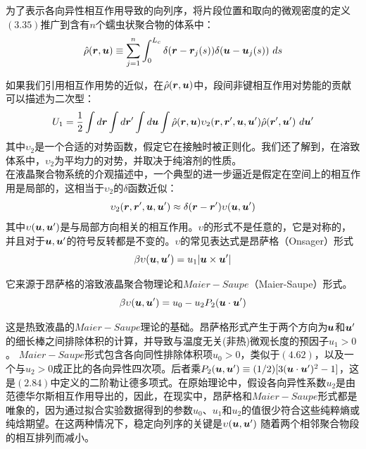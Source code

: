 为了表示各向异性相互作用导致的向列序，将片段位置和取向的微观密度的定义$(3.35)$推广到含有$n$个蠕虫状聚合物的体系中：\\
\begin{equation}
\hat{\rho}(\bm{r},\bm{u}) \equiv \sum_{j=1}^{n} \int _{0}^{L_{c}} \delta(\bm{r}-\bm{r}_{j}(s)) \delta (\bm{u}-\bm{u}_{j}(s))~ds
\end{equation}

如果我们引用相互作用势的近似，在$\hat{\rho}(\bm{r},\bm{u})$中，段间非键相互作用对势能的贡献可以描述为二次型：\\
\begin{equation}
U_1=\frac{1}{2} \int d\bm{r} \int d\bm{r}' \int d\bm{u} \int  \hat{\rho}(\bm{r},\bm{u}) \upsilon_2(\bm{r},\bm{r}',\bm{u},\bm{u}') \hat{\rho}(\bm{r}',\bm{u}')~d\bm{u}'
\end{equation}
其中$\upsilon_2$是一个合适的对势函数，假定它在接触时被正则化。我们还了解到，在溶致体系中，$\upsilon_2$为平均力的对势，并取决于纯溶剂的性质。\\

在液晶聚合物系统的介观描述中，一个典型的进一步逼近是假定在空间上的相互作用是局部的，这相当于$\upsilon_2$的$\delta$函数近似：\\
\begin{equation}
\upsilon_{2}(\bm{r},\bm{r}',\bm{u},\bm{u}') \approx \delta(\bm{r}-\bm{r}') \upsilon(\bm{u},\bm{u}')
\end{equation}
其中$\upsilon(\bm{u},\bm{u}')$是与局部方向相关的相互作用。$\upsilon$的形式不是任意的，它是对称的，并且对于$\bm{u},\bm{u}'$的符号反转都是不变的。$\upsilon$的常见表达式是昂萨格（Onsager）形式\\
\begin{equation}
\beta \upsilon(\bm{u},\bm{u}')= u_{1}|\bm{u}\times \bm{u}'|
\end{equation}

它来源于昂萨格的溶致液晶聚合物理论和$Maier-Saupe$（Maier-Saupe）形式。\\
\begin{equation}
\beta \upsilon(\bm{u},\bm{u}')=u_0 - u_{2} P_{2}(\bm{u} \cdot \bm{u}')
\end{equation}

这是热致液晶的$Maier-Saupe$理论的基础。昂萨格形式产生于两个方向为$\bm{u}$和$\bm{u}'$的细长棒之间排除体积的计算，并导致与温度无关(非热)微观长度的预因子$u_{1}>0$。 $Maier-Saupe$形式包含各向同性排除体积项$u_{0}>0$，类似于$(4.62)$，以及一个与$u_2>0$成正比的各向异性四次项。后者乘$P_{2}(\bm{u},\bm{u}')\equiv (1/2)[3(\bm{u}\cdot \bm{u}')^2-1]$，这是$(2.84)$中定义的二阶勒让德多项式。在原始理论中，假设各向异性系数$u_2$是由范德华尔斯相互作用导出的，因此，在现实中，昂萨格和$Maier-Saupe$形式都是唯象的，因为通过拟合实验数据得到的参数$u_0$、$u_1$和$u_2$的值很少符合这些纯粹熵或纯焓期望。在这两种情况下，稳定向列序的关键是$\upsilon (\bm{u},\bm{u}')$ 随着两个相邻聚合物段的相互排列而减小。\\

